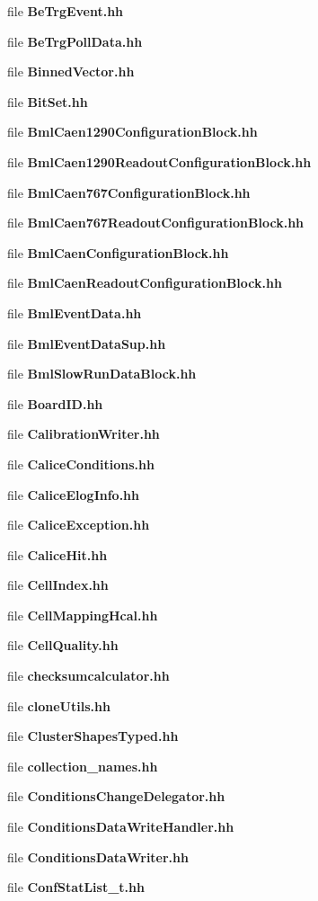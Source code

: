\begin{DoxyCompactItemize}
\item 
file {\bfseries BeTrgEvent.hh}
\item 
file {\bfseries BeTrgPollData.hh}
\item 
file {\bfseries BinnedVector.hh}
\item 
file {\bfseries BitSet.hh}
\item 
file {\bfseries BmlCaen1290ConfigurationBlock.hh}
\item 
file {\bfseries BmlCaen1290ReadoutConfigurationBlock.hh}
\item 
file {\bfseries BmlCaen767ConfigurationBlock.hh}
\item 
file {\bfseries BmlCaen767ReadoutConfigurationBlock.hh}
\item 
file {\bfseries BmlCaenConfigurationBlock.hh}
\item 
file {\bfseries BmlCaenReadoutConfigurationBlock.hh}
\item 
file {\bfseries BmlEventData.hh}
\item 
file {\bfseries BmlEventDataSup.hh}
\item 
file {\bfseries BmlSlowRunDataBlock.hh}
\item 
file {\bfseries BoardID.hh}
\item 
file {\bfseries CalibrationWriter.hh}
\item 
file {\bfseries CaliceConditions.hh}
\item 
file {\bfseries CaliceElogInfo.hh}
\item 
file {\bfseries CaliceException.hh}
\item 
file {\bfseries CaliceHit.hh}
\item 
file {\bfseries CellIndex.hh}
\item 
file {\bfseries CellMappingHcal.hh}
\item 
file {\bfseries CellQuality.hh}
\item 
file {\bfseries checksumcalculator.hh}
\item 
file {\bfseries cloneUtils.hh}
\item 
file {\bfseries ClusterShapesTyped.hh}
\item 
file {\bfseries collection\_\-names.hh}
\item 
file {\bfseries ConditionsChangeDelegator.hh}
\item 
file {\bfseries ConditionsDataWriteHandler.hh}
\item 
file {\bfseries ConditionsDataWriter.hh}
\item 
file {\bfseries ConfStatList\_\-t.hh}
\item 

\end{DoxyCompactItemize}

